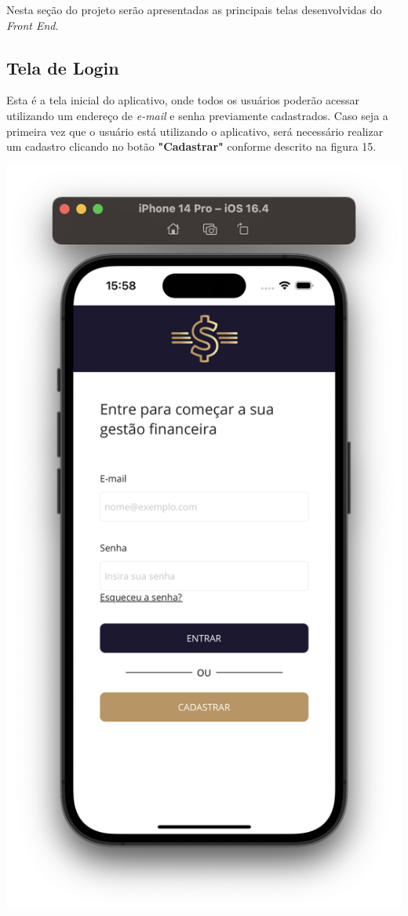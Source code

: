 Nesta seção do projeto serão apresentadas as principais telas desenvolvidas do \textit{Front End}.

\subsection{Tela de Login}

Esta é a tela inicial do aplicativo, onde todos os usuários poderão acessar utilizando um endereço de \textit{e-mail} e senha previamente cadastrados. Caso seja a primeira vez que o usuário está utilizando o aplicativo, será necessário realizar um cadastro clicando no botão \textbf{"Cadastrar"} conforme descrito na figura 15.

    \vspace{\baselineskip}
    \begin{center}
        \begin{minipage}{\textwidth}
            \centering
            \includegraphics[scale=0.17]{figs/figura15.png}

\end{minipage}
\end{center}
